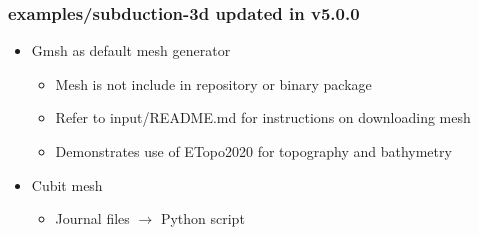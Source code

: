 \documentclass[aspectratio=169]{beamer}
\begin{document}
\begin{frame}
  \frametitle{{\ttfamily examples/subduction-3d} updated in v5.0.0}
  \summary{}

\begin{itemize}
\item Gmsh as default mesh generator
\begin{itemize}
  \item Mesh is not include in repository or binary package
  \item Refer to {\ttfamily input/README.md} for instructions on downloading mesh
  \item Demonstrates use of ETopo2020 for topography and bathymetry
  \end{itemize}
\item Cubit mesh
  \begin{itemize}
  \item Journal files $\rightarrow$ Python script
  \end{itemize}
\end{itemize}

\end{frame}

\end{document}
